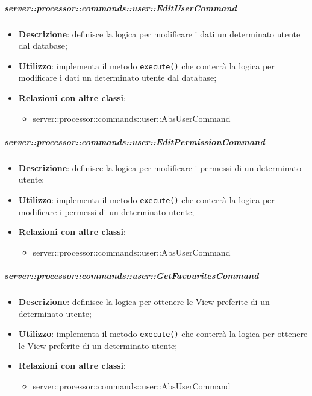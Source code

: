         \subparagraph{server::processor::commands::user::EditUserCommand} %
        \label{subp:bdsm_app_server_processor_commands_user_editusercommand}
        \begin{itemize}
          \item \textbf{Descrizione}: definisce la logica per modificare i dati un determinato utente dal database;
          \item \textbf{Utilizzo}: implementa il metodo \texttt{execute()} che conterrà la logica per modificare i dati un determinato utente dal database;
          \item \textbf{Relazioni con altre classi}:
            \begin{itemize}
              \item server::processor::commands::user::AbsUserCommand
            \end{itemize}
        \end{itemize}

        \subparagraph{server::processor::commands::user::EditPermissionCommand} %
        \label{subp:bdsm_app_server_processor_commands_user_editpermissioncommand}
        \begin{itemize}
          \item \textbf{Descrizione}: definisce la logica per modificare i permessi di un determinato utente;
          \item \textbf{Utilizzo}: implementa il metodo \texttt{execute()} che conterrà la logica per modificare i permessi di un determinato utente;
          \item \textbf{Relazioni con altre classi}:
            \begin{itemize}
              \item server::processor::commands::user::AbsUserCommand
            \end{itemize}
        \end{itemize}

        \subparagraph{server::processor::commands::user::GetFavouritesCommand} %
        \label{subp:bdsm_app_server_processor_commands_user_getfavouritescommand}
        \begin{itemize}
          \item \textbf{Descrizione}: definisce la logica per ottenere le View preferite di un determinato utente;
          \item \textbf{Utilizzo}: implementa il metodo \texttt{execute()} che conterrà la logica per ottenere le View preferite di un determinato utente;
          \item \textbf{Relazioni con altre classi}:
            \begin{itemize}
              \item server::processor::commands::user::AbsUserCommand
            \end{itemize}
        \end{itemize}

